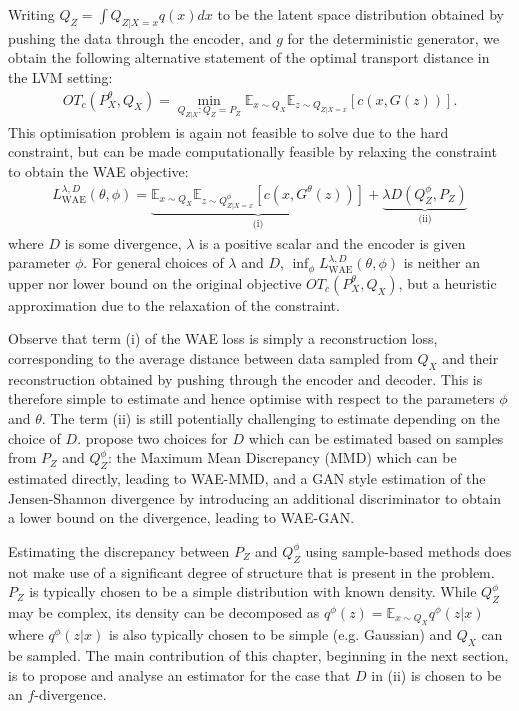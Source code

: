 Writing $Q_Z = \int Q_{Z|X=x} q(x) dx$ to be the latent space distribution obtained by pushing the data through the encoder, and $g$ for the deterministic generator, we obtain the following alternative statement of the optimal transport distance in the LVM setting:
%
\begin{align*}
OT_c(P_X^\theta, Q_X) = \min_{Q_{Z|X}: Q_Z = P_Z} \mathbb{E}_{x\sim Q_X} \mathbb{E}_{z\sim Q_{Z|X=x}} \left[ c(x, G(z)) \right].
\end{align*}
%
This optimisation problem is again not feasible to solve due to the hard constraint, 
but can be made computationally feasible by relaxing the constraint to obtain the WAE objective:
%
\begin{align}
L_{\text{WAE}}^{\lambda, D}(\theta, \phi) = \underbrace{\mathbb{E}_{x\sim Q_X} \mathbb{E}_{z\sim Q^\phi_{Z|X=x}} \left[ c(x, G^\theta(z)) \right]}_{\text{(i)}} + \underbrace{\lambda D\left(Q^\phi_Z, P_Z  \right)}_{\text{(ii)}}
\end{align}
%
where $D$ is some divergence, $\lambda$ is a positive scalar and the encoder is given parameter $\phi$.
For general choices of $\lambda$ and $D$, $\inf_{\phi} L_{\text{WAE}}^{\lambda, D}(\theta, \phi)$ is neither an upper nor lower bound on the original objective $OT_c(P_X^\theta, Q_X)$, but a heuristic approximation due to the relaxation of the constraint. 


Observe that term (i) of the WAE loss is simply a reconstruction loss, corresponding to the average distance between data sampled from $Q_X$ and their reconstruction obtained by pushing through the encoder and decoder.
This is therefore simple to estimate and hence optimise with respect to the parameters $\phi$ and $\theta$.
The term (ii) is still potentially challenging to estimate depending on the choice of $D$. 
\cite{tolstikhin2017wasserstein} propose two choices for $D$ which can be estimated based on samples from $P_Z$ and $Q_Z^\phi$: the Maximum Mean Discrepancy (MMD) \citep{gretton2012kernel} which can be estimated directly, leading to WAE-MMD, and a GAN style estimation of the Jensen-Shannon divergence by introducing an additional discriminator to obtain a lower bound on the divergence, leading to WAE-GAN. 

Estimating the discrepancy between $P_Z$ and $Q_Z^\phi$ using sample-based methods does not make use of a significant degree of structure that is present in the problem. $P_Z$ is typically chosen to be a simple distribution with known density. While $Q_Z^\phi$ may be complex, its density can be decomposed as $q^\phi(z) = \mathbb{E}_{x\sim Q_X} q^\phi(z|x)$ where $q^\phi(z|x)$ is also typically chosen to be simple (e.g. Gaussian) and $Q_X$ can be sampled.
The main contribution of this chapter, beginning in the next section, is to propose and analyse an estimator for the case that $D$ in (ii) is chosen to be an $f$-divergence. 

